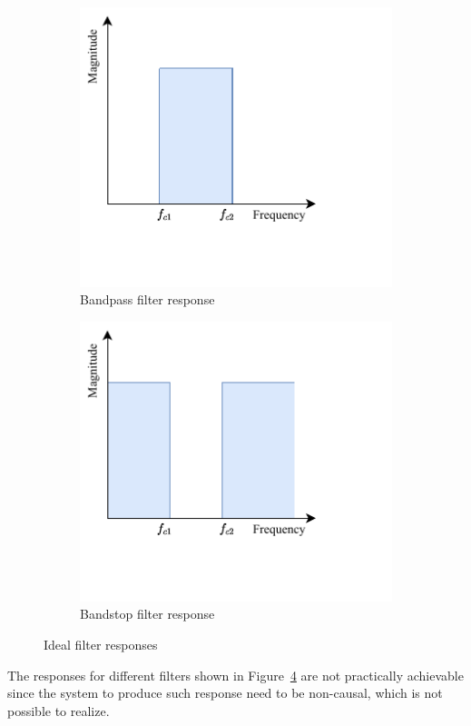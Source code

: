 \begin{figure}[H]
\begin{subfigure}{0.48\textwidth}
        \label{fig:ideal-b}
    \end{subfigure}\newline
    \begin{subfigure}{0.48\textwidth}
        \centering
        \includegraphics[width=0.7\linewidth]{../Figures/idealized_bp}
        \caption{Bandpass filter response}
        \label{fig:ideal-c}
    \end{subfigure}
    \begin{subfigure}{0.48\textwidth}
        \centering
        \includegraphics[width=0.7\linewidth]{../Figures/idealized_bs}
        \caption{Bandstop filter response}
        \label{fig:ideal-d}
    \end{subfigure}
    \caption{Ideal filter responses}
    \label{fig:ideal}
\end{figure}
The responses for different filters shown in Figure~\ref{fig:ideal} are not practically achievable since the system to produce such response need to be non-causal, which is not possible to realize.
